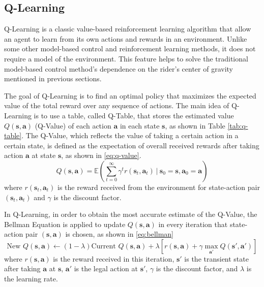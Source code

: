 \documentclass[10pt,a4paper]{article}
\begin{document}
\subsection{Q-Learning}
Q-Learning is a classic value-based reinforcement learning algorithm that allow an agent to learn from its own actions and rewards in an environment. Unlike some other model-based control and reinforcement learning methods, it does not require a model of the environment. This feature helps to solve the traditional model-based control method's dependence on the rider's center of gravity mentioned in previous sections. 

The goal of Q-Learning is to find an optimal policy that maximizes the expected value of the total reward over any sequence of actions. The main idea of Q-Learning is to use a table, called Q-Table, that stores the estimated value $Q(\boldsymbol{s}, \boldsymbol{a})$ (Q-Value) of each action $\boldsymbol{a}$ in each state $\boldsymbol{s}$, as shown in Table \ref{tab:q-table}. The Q-Value, which reflects the value of taking a certain action in a certain state, is defined as the expectation of overall received rewards after taking action $\boldsymbol{a}$ at state $\boldsymbol{s}$, as shown in \eqref{eq:q-value}. 
\begin{equation}
	Q(\boldsymbol{s}, \boldsymbol{a}) = \mathbb{E}\left(\sum_{t = 0}^{\infty} \gamma^{t}r(\boldsymbol{s}_{t}, \boldsymbol{a}_{t}) ~\left|~ \boldsymbol{s}_{0} = \boldsymbol{s}, \boldsymbol{a}_{0} = \boldsymbol{a}\right.\right)
	\label{eq:q-value}
\end{equation}
where $r(\boldsymbol{s}_{t}, \boldsymbol{a}_{t})$ is the reward received from the environment for state-action pair $(\boldsymbol{s}_{t}, \boldsymbol{a}_{t})$ and $\gamma$ is the discount factor. 

In Q-Learning, in order to obtain the most accurate estimate of the Q-Value,  the Bellman Equation is applied to update $Q(\boldsymbol{s}, \boldsymbol{a})$ in every iteration that state-action pair $(\boldsymbol{s}, \boldsymbol{a})$ is chosen, as shown in \eqref{eq:bellman}
\begin{equation}
	\text{New~} Q(\boldsymbol{s}, \boldsymbol{a}) \leftarrow (1-\lambda)\text{Current~} Q(\boldsymbol{s}, \boldsymbol{a}) + \lambda \left[ r(\boldsymbol{s}, \boldsymbol{a}) + \gamma \max_{\boldsymbol{a'}}Q(\boldsymbol{s'}, \boldsymbol{a'})\right]
	\label{eq:bellman}
\end{equation}
where $r(\boldsymbol{s}, \boldsymbol{a})$ is the reward received in this iteration, $\boldsymbol{s'}$ is the transient state after taking $\boldsymbol{a}$ at $\boldsymbol{s}$, $\boldsymbol{a'}$ is the legal action at $\boldsymbol{s'}$, $\gamma$ is the discount factor, and $\lambda$ is the learning rate. 
\end{document}
